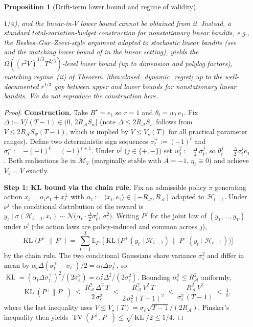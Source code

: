 \documentclass[11pt]{article}
\newcommand{\E}{\mathbb{E}}
\newcommand{\cA}{\mathcal{A}}
\newcommand{\cH}{\mathcal{H}}
\DeclareMathOperator{\KL}{KL}
\DeclareMathOperator{\TV}{TV}
\newtheorem{proposition}{Proposition}
\begin{document}
\begin{proposition}[Drift-term lower bound and regime of validity]
\begin{enumerate}[leftmargin=*,itemsep=1pt]
  $1/4$), and the linear-in-$V$ lower bound cannot be obtained from it.
  Instead, a standard total-variation-budget construction for nonstationary
  linear bandits, e.g., the Besbes--Gur--Zeevi-style argument adapted to
  stochastic linear bandits (see~\citet{besbes2014stochastic,cheung2019learning}
  and the matching lower bound of \citet{russac2019weighted} in the linear
  setting), yields the $\Omega((r^2V)^{1/3}T^{2/3})$-level lower bound (up to
  dimension and polylog factors), matching regime~(ii) of
  Theorem~\ref{thm:closed_dynamic_regret} up to the well-documented
  $r^{1/3}$ gap between upper and lower bounds for nonstationary linear
  bandits.  We do not reproduce the construction here.
\end{enumerate}
\end{proposition}

\begin{proof}
\textbf{Construction.}
Take $B^\star=e_1$ so $r=1$ and $\theta_t=w_t\,e_1$.  Fix
$\Delta:=V/(T-1)\in(0,\,2R_{\cA}S_w]$ (note $\Delta\le 2R_{\cA}S_w$ follows from
$V\le 2R_{\cA}S_w(T-1)$, which is implied by $V\le V_\star(T)$ for all practical
parameter ranges).  Define two deterministic sign sequences
$\sigma_t^{+}:=(-1)^{t}$ and $\sigma_t^{-}:=-(-1)^{t}=(-1)^{t+1}$.
Under $\nu^{j}$ ($j\in\{+,-\}$) set $w_t^{j}:=\tfrac{\Delta}{2}\,\sigma_t^{j}$,
so $\theta_t^{j}=\tfrac{\Delta}{2}\sigma_t^{j}e_1$.  Both realisations lie in
$\widetilde{\mathcal M}_V$ (marginally stable with $A=-1$, $\eta_t\equiv 0$) and
achieve $V_1=V$ exactly.

\textbf{Step 1: KL bound via the chain rule.}
Fix an admissible policy $\pi$ generating action $x_t=\alpha_t e_1+x_t^\perp$
with $\alpha_t:=\langle x_t,e_1\rangle\in[-R_{\cA},R_{\cA}]$ adapted to $\cH_{t-1}$.
Under $\nu^{j}$ the conditional distribution of the reward is
$y_t\mid\sigma(\cH_{t-1},x_t)\sim\mathcal N\bigl(\alpha_t\cdot\tfrac{\Delta}{2}\sigma_t^{j},\,\sigma_\varepsilon^2\bigr)$.
Writing $P^{j}$ for the joint law of $(y_1,\ldots,y_T)$ under $\nu^{j}$
(the action laws are policy-induced and common across $j$),
\[
  \KL\!\bigl(P^{+}\,\|\,P^{-}\bigr)
  \ =\ \sum_{t=1}^{T}\E_{P^{+}}\!\bigl[\KL\bigl(P^{+}(y_t\mid\cH_{t-1})\,\|\,P^{-}(y_t\mid\cH_{t-1})\bigr)\bigr]
\]
by the chain rule.  The two conditional Gaussians share variance
$\sigma_\varepsilon^2$ and differ in mean by
$\alpha_t\Delta(\sigma_t^{+}-\sigma_t^{-})/2=\alpha_t\Delta\sigma_t^{+}$, so
$\KL=(\alpha_t\Delta\sigma_t^{+})^2/(2\sigma_\varepsilon^2)
=\alpha_t^2\Delta^2/(2\sigma_\varepsilon^2)$.  Bounding
$\alpha_t^2\le R_{\cA}^2$ uniformly,
\begin{equation}
  \KL(P^{+}\|P^{-})\ \le\ \frac{R_{\cA}^2\,\Delta^2\,T}{2\,\sigma_\varepsilon^2}
  \ \le\ \frac{R_{\cA}^2\,V^2\,T}{2\,\sigma_\varepsilon^2(T-1)^2}
  \ \le\ \frac{R_{\cA}^2\,V^2}{\sigma_\varepsilon^2\,(T-1)}
  \ \le\ \tfrac{1}{8},
  \label{eq:drift_KL_bound}
\end{equation}
where the last inequality uses $V\le V_\star(T)=\sigma_\varepsilon\sqrt{T-1}/(2R_{\cA})$.
Pinsker's inequality then yields
$\TV(P^{+},P^{-})\le\sqrt{\KL/2}\le 1/4$.


\end{proof}
\end{document}
